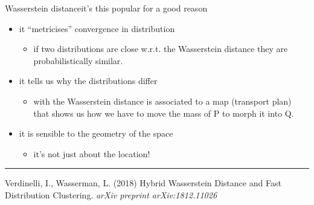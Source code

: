 \documentclass[9 pt]{beamer}
\begin{document}
\begin{frame}{Wasserstein distance}{it's this popular for a good reason}
\begin{itemize}
\tightlist
\item<1-> it ``metricises'' convergence in distribution
  \begin{itemize}
      \item<1-> \textcolor{light}{if two distributions are close w.r.t. the Wasserstein distance they are probabilistically similar.} 
  \end{itemize}
\vspace{0.5cm}


\item<2-> it tells us why the distributions differ
\begin{itemize}
    \item<2-> \textcolor{light}{with the Wasserstein distance is associated to a map (transport plan) that shows us how we have to move the mass of P to morph it into Q.}
\end{itemize}
\vspace{0.5cm}


\item<3->
  it is sensible to the geometry of the space
  \begin{itemize}
      \item<3-> \textcolor{light}{it's not just about the location!}
  \end{itemize}

\end{itemize}

\vspace{0.75cm}
\textcolor[RGB]{220,220,220}{\rule{\linewidth}{0.2pt}}
\tiny{\faBook \; Verdinelli, I., Wasserman, L. (2018) Hybrid Wasserstein Distance and Fast Distribution Clustering. \textit{arXiv preprint arXiv:1812.11026}}

\end{frame}
\end{document}
